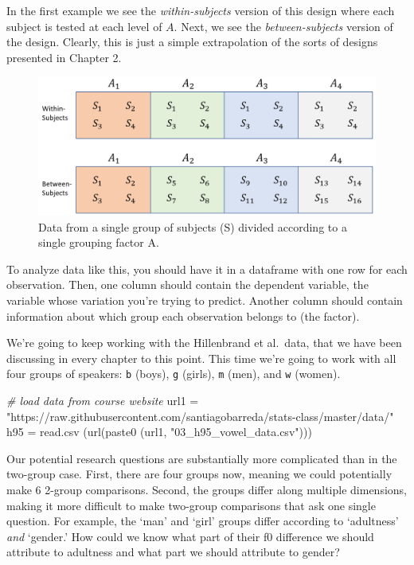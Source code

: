 \documentclass[
]{book}
\newenvironment{Shaded}{\begin{snugshade}}{\end{snugshade}}
\newcommand{\CommentTok}[1]{\textcolor[rgb]{0.56,0.35,0.01}{\textit{#1}}}
\newcommand{\FunctionTok}[1]{\textcolor[rgb]{0.00,0.00,0.00}{#1}}
\newcommand{\NormalTok}[1]{#1}
\newcommand{\OtherTok}[1]{\textcolor[rgb]{0.56,0.35,0.01}{#1}}
\newcommand{\StringTok}[1]{\textcolor[rgb]{0.31,0.60,0.02}{#1}}
\begin{document}
In the first example we see the \emph{within-subjects} version of this design where each subject is tested at each level of \(A\). Next, we see the \emph{between-subjects} version of the design. Clearly, this is just a simple extrapolation of the sorts of designs presented in Chapter 2.

\begin{figure}

{\centering \includegraphics[width=0.8\linewidth]{./images/design_ch4_1} 

}

\caption{Data from a single group of subjects (S) divided according to a single grouping factor A.}\label{fig:F4-designfig}
\end{figure}

To analyze data like this, you should have it in a dataframe with one row for each observation. Then, one column should contain the dependent variable, the variable whose variation you're trying to predict. Another column should contain information about which group each observation belongs to (the factor).

We're going to keep working with the Hillenbrand et al.~data, that we have been discussing in every chapter to this point. This time we're going to work with all four groups of speakers: \texttt{b} (boys), \texttt{g} (girls), \texttt{m} (men), and \texttt{w} (women).

\begin{Shaded}
\begin{Highlighting}[]
\CommentTok{\# load data from course website}
\NormalTok{url1 }\OtherTok{=} \StringTok{"https://raw.githubusercontent.com/santiagobarreda/stats{-}class/master/data/"}
\NormalTok{h95 }\OtherTok{=} \FunctionTok{read.csv}\NormalTok{ (}\FunctionTok{url}\NormalTok{(}\FunctionTok{paste0}\NormalTok{ (url1, }\StringTok{"03\_h95\_vowel\_data.csv"}\NormalTok{)))}
\end{Highlighting}
\end{Shaded}

Our potential research questions are substantially more complicated than in the two-group case. First, there are four groups now, meaning we could potentially make 6 2-group comparisons. Second, the groups differ along multiple dimensions, making it more difficult to make two-group comparisons that ask one single question. For example, the `man' and `girl' groups differ according to `adultness' \emph{and} `gender.' How could we know what part of their f0 difference we should attribute to adultness and what part we should attribute to gender?
\end{document}
